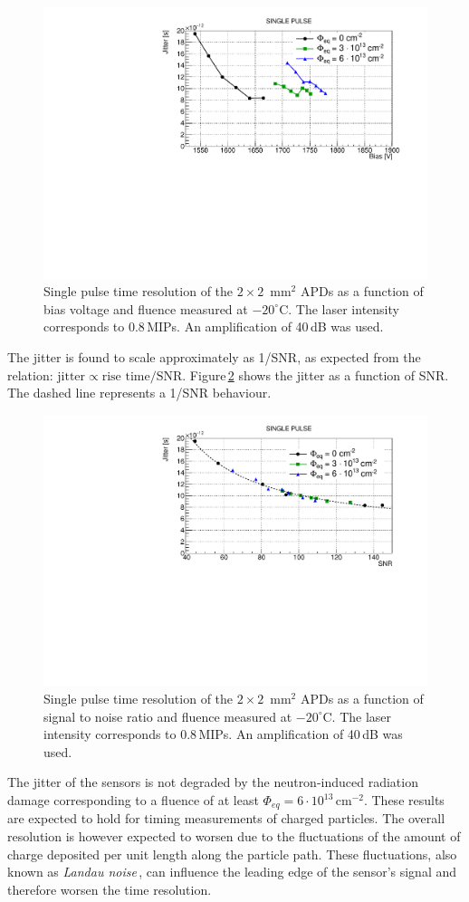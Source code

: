 \documentclass[review,number,sort&compress]{elsarticle}
\begin{document}
\begin{figure}
  \centering
  \includegraphics[width = 0.6 \columnwidth]{timeRes2x2APDsNo1e15}
  \caption{Single pulse time resolution of the $2 \times 2$~mm$^2$ APDs as a function of bias voltage and fluence measured at $-20^\circ$C. The laser intensity corresponds to 0.8\,MIPs. An amplification of 40\,dB was used.}
  \label{fig:timeRes2x2}
\end{figure}

The jitter is found to scale approximately as 1/SNR, as expected from the relation: $\textrm{jitter} \propto \textrm{rise time} / \textrm{SNR}$.
Figure\,\ref{fig:timeRes2x2_snr} shows the jitter as a function of SNR.
The dashed line represents a 1/SNR behaviour.

\begin{figure}
  \centering
  \includegraphics[width = 0.6 \columnwidth]{timeRes2x2APDsNo1e15_SNR}
  \caption{Single pulse time resolution of the $2 \times 2$~mm$^2$ APDs as a function of signal to noise ratio and fluence measured at $-20^\circ$C. The laser intensity corresponds to 0.8\,MIPs. An amplification of 40\,dB was used.}
  \label{fig:timeRes2x2_snr}
\end{figure}

The jitter of the sensors is not degraded by the neutron-induced radiation damage corresponding to a fluence of at least $\Phi_{eq} = 6 \cdot 10^{13}$\,cm$^{-2}$.
These results are expected to hold for timing measurements of charged particles.
The overall resolution is however expected to worsen due to the fluctuations of the amount of charge deposited per unit length along the particle path.
These fluctuations, also known as {\em Landau noise}\,\cite{cartiglia2017}, can influence the leading edge of the sensor's signal and therefore worsen the time resolution.
\end{document}
